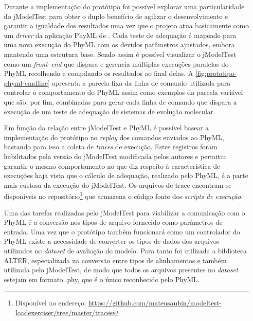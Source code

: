 \documentclass[english,brazilian]{UNISINOSmonografia} %
\begin{document}
Durante a implementação do protótipo foi possível explorar uma particularidade do jModelTest para obter o duplo benefício de agilizar o desenvolvimento e garantir a igualdade dos resultados uma vez que o projeto atua basicamente como um \textit{driver} da aplicação PhyML de .
Cada teste de adequação é mapeado para uma nova execução do PhyML com os devidos parâmetros ajustados, embora mantendo uma estrutura base.
Sendo assim é possível visualizar o jModelTest como um \textit{front--end} que dispara e gerencia múltiplas execuções paralelas do PhyML recolhendo e compilando os resultados ao final delas.
A \autoref{fig:prototipo-phyml-cmdline} apresenta a parcela fixa da linha de comando utilizada para controlar o comportamento do PhyML assim como exemplos da parcela variável que são, por fim, combinadas para gerar cada linha de comando que dispara a execução de um teste de adequação de sistemas de evolução molecular.


Em função da relação entre jModelTest e PhyML é possível basear a implementação do protótipo no \textit{replay} dos comandos enviados ao PhyML, bastando para isso a coleta de \textit{traces} de execução.
Estes registros foram habilitados pela versão do jModelTest modificada pelos autores e permitiu garantir o mesmo comportamento no que diz respeito à característica de execuções haja vista que o cálculo de adequação, realizado pelo PhyML, é a parte mais custosa da execução do jModelTest.
Os arquivos de trace encontram-se disponíveis no repositório\footnote{
	Disponível no endereço: \url{https://github.com/mateusaubin/modeltest-loadexerciser/tree/master/traces}
} que armazena o código fonte dos \textit{scripts de execução}.


Uma das tarefas realizadas pelo jModelTest para viabilizar a comunicação com o PhyML é a conversão nos tipos de arquivo fornecido como parâmetros de entrada.
Uma vez que o protótipo também funcionará como um controlador do PhyML existe a necessidade de converter os tipos de dados dos arquivos utilizados no \textit{dataset} de avaliação do modelo.
Para tanto foi utilizada a biblioteca ALTER, especializada na conversão entre tipos de alinhamentos e também utilizada pelo jModelTest, de modo que todos os arquivos presentes no \textit{dataset} estejam em formato .phy, que é o único reconhecido pelo PhyML.
\end{document}
